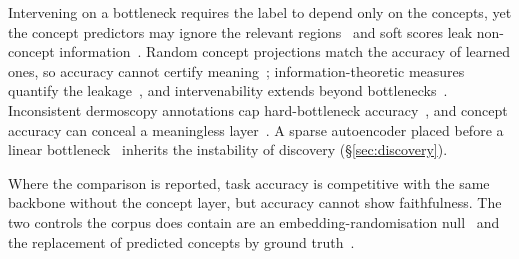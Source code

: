 Intervening on a bottleneck requires the label to depend only on the concepts, yet
the concept predictors may ignore the relevant regions~\cite{margeloiu2021do} and soft scores leak
non-concept information~\cite{havasi2022addressing}. Random concept projections match the accuracy of
learned ones, so accuracy cannot certify meaning~\cite{srivastava2024vlg,schmalwasser2026faithfulness};
information-theoretic measures quantify the leakage~\cite{parisini2025leakage,makonnen2025measuring},
and intervenability extends beyond bottlenecks~\cite{marcinkevics2024beyond}. Inconsistent dermoscopy
annotations cap hard-bottleneck accuracy~\cite{napoles2026concept}, and concept accuracy can conceal a
meaningless layer~\cite{han2026loss}. A sparse autoencoder placed before a linear
bottleneck~\cite{rao2024discover} inherits the instability of discovery (\S\ref{sec:discovery}).

Where the comparison is reported, task accuracy is competitive with the same backbone without the
concept layer, but accuracy cannot show faithfulness. The two controls the corpus does contain are an
embedding-randomisation null~\cite{zhang2026regionfm} and the replacement of predicted concepts by
ground truth~\cite{patricio2025twostep}.
